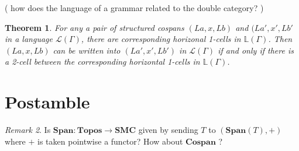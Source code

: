 \documentclass{amsart}
\newcommand{\LL}{\mathbb{L}}
\newcommand{\cat}[1]{\mathbf{#1}}
\newcommand{\from}{\colon}
\newcommand{\Span}{\mathbf{Span}}
\newcommand{\Cospan}{\mathbf{Cospan}}
\newcommand{\edit}[1]{\textcolor{editcolour}{(#1)}}
\newtheorem{theorem}{Theorem}[section]
\theoremstyle{remark}
\newtheorem{remark}[theorem]{Remark}
\theoremstyle{definition}
\begin{document}
\edit{ how does the language of a grammar related to the double category? } 


\begin{theorem}
  
  For any a pair of structured cospans \( (La,x,Lb) \) and
  \( (La',x',Lb' \) in a language \( \mathcal{L} (\Gamma) \), there
  are corresponding horizonal 1-cells in \( \LL (\Gamma) \). Then
  \( (La,x,Lb) \) can be written into \( (La',x',Lb') \) in
  \( \mathcal{L} (\Gamma) \) if and only if there is a 2-cell between
  the corresponding horizontal 1-cells in \( \LL (\Gamma) \).
  
\end{theorem}


\section{Postamble} \label{sec:postable}


\begin{remark}
  Is \( \Span \from \cat{Topos} \to \cat{SMC}
  \) given by sending \( T \) to \( (\Span (T),+) \) where \( + \) is
  taken pointwise a functor?  How about \( \Cospan \) ?
\end{remark}




\end{document}
